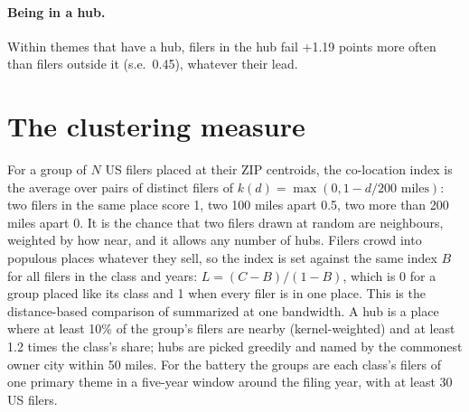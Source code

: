 \paragraph{Being in a hub.} Within themes that have a hub, filers in the hub fail +1.19 points more often than filers outside it (s.e.\ 0.45), whatever their lead.
\section*{The clustering measure}
For a group of $N$ US filers placed at their ZIP centroids, the co-location index is the average over pairs of distinct filers of $k(d) = \max(0, 1 - d/200\text{ miles})$: two filers in the same place score 1, two 100 miles apart 0.5, two more than 200 miles apart 0. It is the chance that two filers drawn at random are neighbours, weighted by how near, and it allows any number of hubs. Filers crowd into populous places whatever they sell, so the index is set against the same index $B$ for all filers in the class and years: $L = (C - B)/(1 - B)$, which is 0 for a group placed like its class and 1 when every filer is in one place. This is the distance-based comparison of \citet{DurantonOverman2005} summarized at one bandwidth. A hub is a place where at least 10\% of the group's filers are nearby (kernel-weighted) and at least 1.2 times the class's share; hubs are picked greedily and named by the commonest owner city within 50 miles. For the battery the groups are each class's filers of one primary theme in a five-year window around the filing year, with at least 30 US filers.

